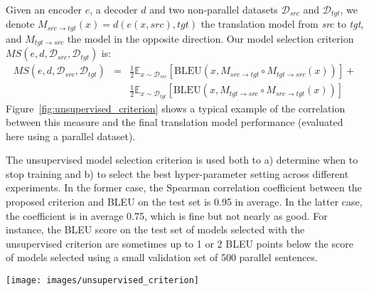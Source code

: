 Given an encoder $e$, a decoder $d$ and two non-parallel datasets $\mathcal{D}_{src}$ and $\mathcal{D}_{tgt}$, we denote $M_{src \rightarrow tgt}(x) = d(e(x,src),tgt)$ the translation model from \textit{src} to \textit{tgt}, and $M_{tgt \rightarrow src}$ the model in the opposite direction. Our model selection criterion  $MS(e,d,\mathcal{D}_{src},\mathcal{D}_{tgt})$ is:
\begin{eqnarray}
    MS(e,d,\mathcal{D}_{src},\mathcal{D}_{tgt}) &=& \frac{1}{2} 
    \mathbb{E}_{x \sim \mathcal{D}_{src}}\left[ \mathrm{BLEU}(x,M_{src \rightarrow tgt} \circ M_{tgt \rightarrow src}(x) ) \right] + \nonumber \\ 
    & & \frac{1}{2} 
    \mathbb{E}_{x \sim \mathcal{D}_{tgt}}\left[ \mathrm{BLEU}(x,M_{tgt \rightarrow src} \circ M_{src \rightarrow tgt}(x) ) \right] \label{eq:ms}
\end{eqnarray}
Figure~\ref{fig:unsupervised_criterion} shows a typical example of the correlation between this measure and the final translation model performance (evaluated here using a parallel dataset).

The unsupervised model selection criterion is used both to a) determine when to stop training and b) to select the best hyper-parameter setting across different experiments. In the former case, the Spearman correlation coefficient between the proposed criterion and BLEU on the test set is 0.95 in average. In the latter case, the coefficient is in average 0.75, which is fine but not nearly as good. For instance, the BLEU score on the test set of models selected with the unsupervised criterion are sometimes up to 1 or 2 BLEU points below the score of models selected using a small validation set of 500 parallel sentences.


\begin{SCfigure}%
    \centering
   \texttt{[image: images/unsupervised\_criterion]}
   \caption{\textbf{Unsupervised model selection.} BLEU score of the source to target and target to source models on the Multi30k-Task1 English-French dataset as a function of the number of passes through the dataset at iteration ${(t)}=1$ of the algorithm (training $M(2)$ given $M(1)$). BLEU correlates very well with the proposed model selection criterion, see Equation~\ref{eq:ms}.\label{fig:unsupervised_criterion}}
\end{SCfigure}

